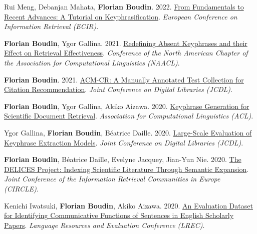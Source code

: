 \item
Rui Meng, Debanjan Mahata, \textbf{Florian Boudin}.
2022.
\href{https://link.springer.com/chapter/10.1007/978-3-030-99739-7_73}{From Fundamentals to Recent Advances: A Tutorial on Keyphrasification}.
\textit{European Conference on Information Retrieval (ECIR)}.
\label{meng-etal-2022-fundamentals}

\item 
\textbf{Florian Boudin}, Ygor Gallina.
2021.
\href{https://www.aclweb.org/anthology/2021.naacl-main.330.pdf}{Redefining Absent Keyphrases and their Effect on Retrieval Effectiveness}.
\textit{Conference of the North American Chapter of the Association for Computational Linguistics (NAACL)}.
\label{boudin-gallina-2021-redefining}

\item
\textbf{Florian Boudin}.
2021.
\href{https://arxiv.org/pdf/2108.07571.pdf}{ACM-CR: A Manually Annotated Test Collection for Citation Recommendation}.
\textit{Joint Conference on Digital Libraries (JCDL)}.
\label{boudin-2021-acm}

\item
\textbf{Florian Boudin}, Ygor Gallina, Akiko Aizawa.
2020.
\href{https://aclanthology.org/2020.acl-main.105.pdf}{Keyphrase Generation for Scientific Document Retrieval}.
\textit{Association for Computational Linguistics (ACL)}.
\label{boudin-etal-2020-keyphrase}

\item
Ygor Gallina, \textbf{Florian Boudin}, Béatrice Daille.
2020.
\href{https://dl.acm.org/doi/10.1145/3383583.3398517}{Large-Scale Evaluation of Keyphrase Extraction Models}.
\textit{Joint Conference on Digital Libraries (JCDL)}.
\label{gallina-etal-2020-large}

\item
\textbf{Florian Boudin}, Béatrice Daille, Evelyne Jacquey, Jian-Yun Nie.
2020.
\href{http://ceur-ws.org/Vol-2621/CIRCLE20_27.pdf}{The DELICES Project: Indexing Scientific Literature Through Semantic Expansion}.
\textit{Joint Conference of the Information Retrieval Communities in Europe (CIRCLE)}.
\label{boudin-etal-2020-delices}

\item
Kenichi Iwatsuki, \textbf{Florian Boudin}, Akiko Aizawa.
2020.
\href{https://aclanthology.org/2020.lrec-1.212.pdf}{An Evaluation Dataset for Identifying Communicative Functions of Sentences in English Scholarly Papers}.
\textit{Language Resources and Evaluation Conference (LREC)}.
\label{iwatsuki-etal-2020-evaluation}

